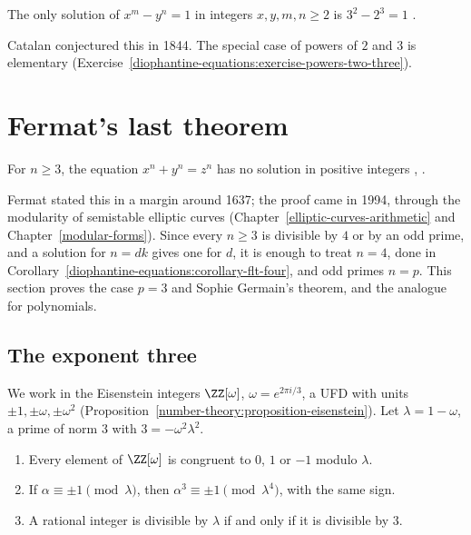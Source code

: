 \begin{theorem}\label{diophantine-equations:theorem-catalan}
The only solution of $x^m - y^n = 1$ in integers $x, y, m, n \geq 2$ is $3^2 - 2^3 = 1$ \cite{mihailescu-2004}.
\end{theorem}

Catalan conjectured this in 1844. The special case of powers of $2$ and $3$ is elementary (Exercise~\ref{diophantine-equations:exercise-powers-two-three}).

\section{Fermat's last theorem}\label{diophantine-equations:section-flt}

\begin{theorem}\label{diophantine-equations:theorem-flt}
For $n \geq 3$, the equation $x^n + y^n = z^n$ has no solution in positive integers \cite{wiles-1995}, \cite{taylor-wiles-1995}.
\end{theorem}

Fermat stated this in a margin around 1637; the proof came in 1994, through the modularity of semistable elliptic curves (Chapter~\ref{elliptic-curves-arithmetic} and Chapter~\ref{modular-forms}). Since
every $n \geq 3$ is divisible by $4$ or by an odd prime, and a solution for $n = dk$ gives one for $d$, it is enough to treat $n = 4$, done in Corollary~\ref{diophantine-equations:corollary-flt-four}, and odd
primes $n = p$. This section proves the case $p = 3$ and Sophie Germain's theorem, and the analogue for polynomials.

\subsection{The exponent three}\label{diophantine-equations:subsection-three}

We work in the Eisenstein integers $\ZZ[\omega]$, $\omega = e^{2\pi i/3}$, a UFD with units $\pm1, \pm\omega, \pm\omega^2$ (Proposition~\ref{number-theory:proposition-eisenstein}). Let $\lambda = 1 - \omega$, a
prime of norm $3$ with $3 = -\omega^2\lambda^2$.

\begin{lemma}\label{diophantine-equations:lemma-eisenstein-cubes}
\begin{enumerate}
\item Every element of $\ZZ[\omega]$ is congruent to $0$, $1$ or $-1$ modulo $\lambda$.
\item If $\alpha \equiv \pm1 \pmod \lambda$, then $\alpha^3 \equiv \pm1 \pmod{\lambda^4}$, with the same sign.
\item A rational integer is divisible by $\lambda$ if and only if it is divisible by $3$.
\end{enumerate}
\end{lemma}

